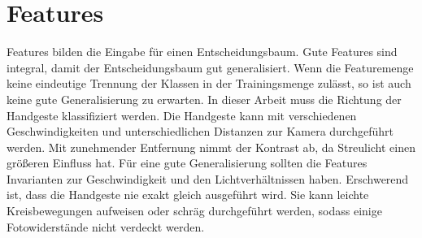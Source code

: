 \section{Features}
Features bilden die Eingabe für einen Entscheidungsbaum. Gute Features sind integral, damit der Entscheidungsbaum gut generalisiert. Wenn die Featuremenge keine eindeutige Trennung der Klassen in der
Trainingsmenge zulässt, so ist auch keine gute Generalisierung zu erwarten.
\newline
\newline
In dieser Arbeit muss die Richtung der Handgeste klassifiziert werden. Die Handgeste kann mit verschiedenen Geschwindigkeiten und unterschiedlichen Distanzen zur Kamera durchgeführt werden. Mit
zunehmender Entfernung nimmt der Kontrast ab, da Streulicht einen größeren Einfluss hat. Für eine gute Generalisierung sollten die Features Invarianten zur Geschwindigkeit und den
Lichtverhältnissen haben. Erschwerend ist, dass die Handgeste nie exakt gleich ausgeführt wird. Sie kann leichte Kreisbewegungen aufweisen oder schräg durchgeführt werden, sodass einige
Fotowiderstände nicht verdeckt werden.

